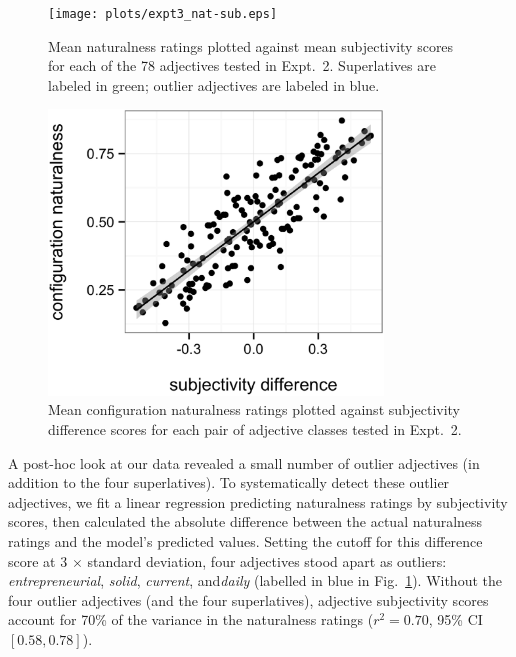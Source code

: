 \documentclass[12pt]{article}
\newcommand{\ndg}[1]{\textcolor{Green}{[ndg: #1]}}
\begin{document}
\begin{figure}
	\centering\texttt{[image: plots/expt3\_nat-sub.eps]}
	\caption{Mean naturalness ratings plotted against mean subjectivity scores for each of the 78 adjectives tested in Expt.~2. Superlatives are labeled in green; outlier adjectives are labeled in blue. 
		}\label{fig:exp3-nat-subj}
\end{figure}

\begin{figure}
	\centering\includegraphics[width=3.5in]{plots/naturalness-subjectivity_class-difference_no-sup.eps}
	\caption{Mean configuration naturalness ratings plotted against subjectivity difference scores for each pair of adjective classes tested in Expt.~2. 
		}\label{fig:exp3-nat-subj-diff}
\end{figure}

A post-hoc look at our data revealed a small number of outlier adjectives (in addition to the four superlatives). To systematically detect these outlier adjectives, we fit a linear regression predicting naturalness ratings by subjectivity scores, then calculated the absolute difference between the actual naturalness ratings and the model's predicted values. Setting the cutoff for this difference score at 3 $\times$ standard deviation, four adjectives stood apart as outliers: ​\emph{entrepreneurial}, ​\emph{solid}, ​\emph{current}, and ​\emph{daily} (labelled in blue in Fig.~\ref{fig:exp3-nat-subj}). Without the four outlier adjectives (and the four superlatives), adjective subjectivity scores account for 70\% of the variance in the naturalness ratings ($r^2=0.70$, 95\% CI $[0.58,  0.78]$).
\end{document}
